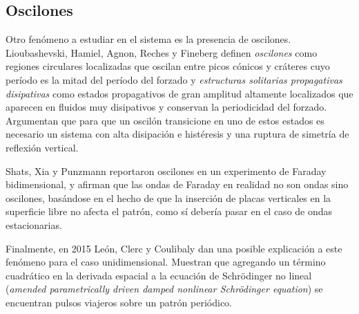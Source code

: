 \documentclass[../main.tex]{subfiles}
\begin{document}
\subsection{Oscilones}
Otro fenómeno a estudiar en el sistema es la presencia de oscilones. Lioubashevski, Hamiel, Agnon, Reches y Fineberg \cite{lioubashevski_oscillons_1999} definen \textit{oscilones} como regiones circulares localizadas que oscilan entre picos cónicos y cráteres cuyo período es la mitad del período del forzado y \textit{estructuras solitarias propagativas disipativas} como estados propagativos de gran amplitud altamente localizados que aparecen en fluidos muy disipativos y conservan la periodicidad del forzado. Argumentan que para que un oscilón transicione en uno de estos estados es necesario un sistema con alta disipación e histéresis y una ruptura de simetría de reflexión vertical. 

Shats, Xia y Punzmann \cite{shats_parametrically_2012} reportaron oscilones en un experimento de Faraday bidimensional, y afirman que las ondas de Faraday en realidad no son ondas sino oscilones, basándose en el hecho de que la inserción de placas verticales en la superficie libre no afecta el patrón, como sí debería pasar en el caso de ondas estacionarias. 

Finalmente, en 2015 León, Clerc y Coulibaly \cite{leon_traveling_2015} dan una posible explicación a este fenómeno para el caso unidimensional. Muestran que agregando un término cuadrático en la derivada espacial a la ecuación de Schrödinger no lineal (\textit{amended parametrically driven damped nonlinear Schrödinger equation}) se encuentran pulsos viajeros sobre un patrón periódico. 
\end{document}
